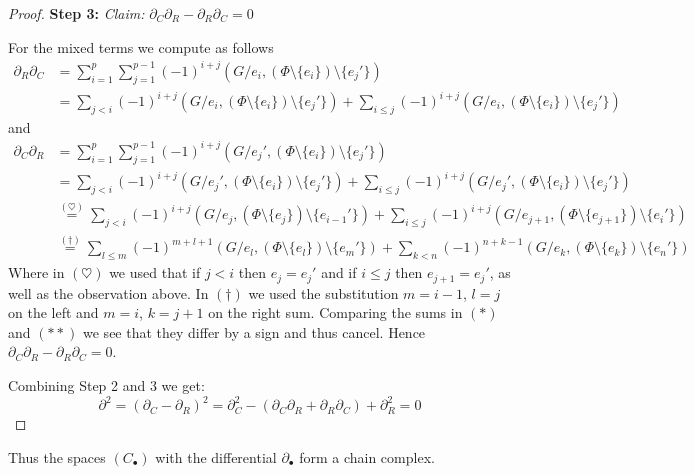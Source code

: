 \begin{proof}
	\textbf{Step 3:} \emph{Claim:} $\partial_{C} \partial_{R} - \partial_{R} \partial_{C} = 0$

	For the mixed terms we compute as follows
	\begin{align*}
		\partial_{R} \partial_{C} &=  \sum_{i=1}^{p} \sum_{j=1}^{p-1} (-1)^{i+j}(G / e_{i}, (\Phi \setminus \{e_{i}\} ) \setminus \{e_{j}'\})  \\
					   &= \sum_{j < i} (-1)^{i+j} (G / e_{i}, (\Phi \setminus \{e_{i}\} ) \setminus \{e_{j}'\}) + \sum_{i \leq j} (-1)^{i+j}
					   (G / e_{i}, (\Phi \setminus \{e_{i}\} ) \setminus \{e_{j}'\}) \tag{$*$}
	\end{align*}
	and
	\begin{align*}
		\partial_{C} \partial_{R} &=  \sum_{i=1}^{p} \sum_{j=1}^{p-1} (-1)^{i+j}(G / e_{j}', (\Phi \setminus \{e_{i}\} ) \setminus \{e_{j}'\})  \\
					   &= \sum_{j < i} (-1)^{i+j} (G / e_{j}', (\Phi \setminus \{e_{i}\} ) \setminus \{e_{j}'\}) + \sum_{i \leq j} (-1)^{i+j}
					   (G / e_{j}', (\Phi \setminus \{e_{i}\} ) \setminus \{e_{j}'\}) \\
					   &\stackrel{(\heartsuit)}{=} \sum_{j < i} (-1)^{i+j} (G / e_{j}, (\Phi \setminus \{e_{j}\} ) \setminus \{e_{i-1}'\}) + \sum_{i \leq j} (-1)^{i+j}
					   (G / e_{j+1}, (\Phi \setminus \{e_{j+1}\} ) \setminus \{e_{i}'\}) \\
					   &\stackrel{(\dagger)}{=} \sum_{l \leq m} (-1)^{m+l+1} (G / e_{l}, (\Phi \setminus \{e_{l}\} ) \setminus \{e_{m}'\}) + \sum_{k < n} (-1)^{n+k-1}
					   (G / e_{k}, (\Phi \setminus \{e_{k}\} ) \setminus \{e_{n}'\}) \tag{$* *$}
	\end{align*}
	Where in $(\heartsuit)$ we used that if $j < i$ then $e_{j} = e_{j}'$ and if $i \leq j$ then $e_{j+1} = e_{j}'$, as well as the observation above.
	In $(\dagger)$ we used the substitution  $m = i-1$,  $l = j$ on the left and  $m = i$,  $k = j+1$ on the right sum.
	Comparing the sums in $(*)$ and $(* *)$ we see that they differ by a sign and thus cancel. Hence  $\partial_{C} \partial_{R} - \partial_{R} \partial_{C} = 0$.

	Combining Step 2 and 3 we get:
	\[
		\partial^2 = (\partial_{C} - \partial_{R})^2 = \partial_{C}^2 - (\partial_{C} \partial_{R} + \partial_{R} \partial_{C}) + \partial_{R}^2 = 0
	\]
\end{proof}

Thus the spaces $(C_{\bullet})$ with the differential $\partial_{\bullet}$ form a chain complex.

